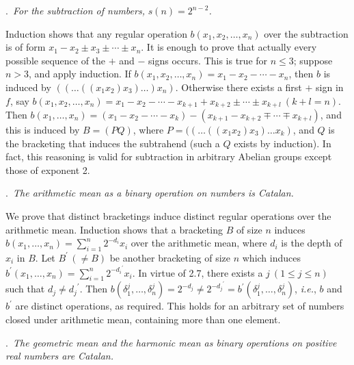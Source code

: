 \documentclass[a4paper,reqno]{amsart}\usepackage{amssymb,latexsym}
\theoremstyle{definition}
\theoremstyle{remark}
\numberwithin{equation}{section}
\numberwithin{theorem}{section}
\begin{document}
\bigskip

.\textit{\ For the subtraction of numbers, }$s(n)=2^{n-2}$\textit{.}

\smallskip

Induction shows that any regular operation $b(x_{1},x_{2},\ldots,x_{n})$ over
the subtraction is of form $x_{1}-x_{2}\pm x_{3}\pm\cdots\pm x_{n}$. It is
enough to prove that actually every possible sequence of the $+$ and $- $
signs occurs. This is true for $n\leq3$; suppose $n>3$, and apply induction.
If $b(x_{1},x_{2},\ldots,x_{n})=x_{1}-x_{2}-\cdots-x_{n}$, then $b$ is induced
by $((\ldots((x_{1}x_{2})x_{3})\ldots)x_{n})$. Otherwise there exists a first
$+$ sign in $f$, say $b(x_{1},x_{2},\ldots,x_{n})=x_{1}-x_{2}-\cdots
-x_{k+1}+x_{k+2}\pm\cdots\pm x_{k+l}~(k+l=n)$. Then $b(x_{1},\ldots
,x_{n})=(x_{1}-x_{2}-\cdots-x_{k})-(x_{k+1}-x_{k+2}\mp\cdots\mp x_{k+l})$, and
this is induced by $B=(PQ)$, where $P=((\ldots((x_{1}x_{2})x_{3})\ldots
x_{k})$, and $Q$ is the bracketing that induces the subtrahend (such a $Q$
exists by induction). In fact, this reasoning is valid for subtraction in
arbitrary Abelian groups except those of exponent 2.

\bigskip

.\textit{\ The arithmetic mean as a binary operation on numbers is
Catalan.}

\smallskip

We prove that distinct bracketings induce distinct regular operations over the
arithmetic mean. Induction shows that a bracketing $B$ of size $n$
induces\linebreak$b(x_{1},\ldots,x_{n})=\sum_{i=1}^{n}{2^{-d_{i}}x_{i}}$ over
the arithmetic mean, where $d_{i}$ is the depth of $x_{i}$ in $B$. Let
$B^{\prime}\,(\neq B)$ be another bracketing of size $n$ which induces
$b^{\prime}(x_{1},\ldots,x_{n})=\sum_{i=1}^{n}{2^{{-d_{i}}^{\prime}}x_{i}}$.
In virtue of 2.7, there exists a $j~(1\leq j\leq n)$ such that $d_{j}\neq{d_{j}}^{\prime}$. Then $b(\delta_{1}^{j},\ldots,\delta_{n}^{j})=2^{-d_{j}}\neq{2^{{-d_{j}}^{\prime}}}=b^{\prime}(\delta_{1}^{j},\ldots,\delta_{n}^{j})$, \textit{i.e.}, $b$ and $b^{\prime}$ are distinct
operations, as required. This holds for an arbitrary set of numbers closed
under arithmetic mean, containing more than one element.

\bigskip

.\textit{\ The geometric mean and the harmonic mean as binary
operations on positive real numbers are Catalan.}

\smallskip
\end{document}
